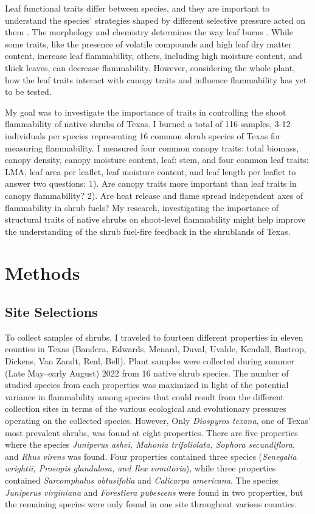 \documentclass[12pt]{report}
\begin{document}
Leaf functional traits differ between species, and they are important to understand the species' strategies shaped by different selective pressure acted on them \citep{wright2004worldwide}. The morphology and chemistry determines the way leaf burns \citep{anderson1970forest, owens1998seasonal, schwilk2011scaling, pausas2016secondary, guerrero2021leaf, ganteaume2021volatile,alam2020shoot}. While some traits, like the presence of volatile compounds and high leaf dry matter content, increase leaf flammability, others, including high moisture content, and thick leaves, can decrease flammability. However, considering the whole plant, how the leaf traits interact with canopy traits and influence flammability has yet to be tested.

My goal was to investigate the importance of traits in controlling the shoot flammability of native shrubs of Texas. I burned a total of 116 samples, 3-12 individuals per species representing 16 common shrub species of Texas for measuring flammability. I measured four common canopy traits: total biomass, canopy density, canopy moisture content, leaf: stem, and four common leaf traits: LMA, leaf area per leaflet, leaf moisture content, and leaf length per leaflet to answer two questions: 1). Are canopy traits more important than leaf traits in canopy flammability? 2). Are heat release and flame spread independent axes of flammability in shrub fuels? My research, investigating the importance of structural traits of native shrubs on shoot-level flammability might help improve the understanding of the shrub fuel-fire feedback in the shrublands of Texas.


\section{Methods}
\subsection{Site Selections}

To collect samples of shrubs, I traveled to fourteen different properties in eleven counties in Texas (Bandera, Edwards, Menard, Duval, Uvalde, Kendall, Bastrop, Dickens, Van Zandt, Real, Bell). Plant samples were collected during summer (Late May–early August) 2022 from 16 native shrub species. The number of studied species from each properties was maximized in light of the potential variance in flammability among species that could result from the different collection sites in terms of the various ecological and evolutionary pressures operating on the collected species. However, Only \emph{Diospyros texana}, one of Texas' most prevalent shrubs, was found at eight properties. There are five properties where the species \emph{Juniperus ashei, Mahonia trifoliolata, Sophora secundiflora}, and \emph{Rhus virens} was found. Four properties contained three species (\emph{Senegalia wrightii, Prosopis glandulosa, and Ilex vomitoria}), while three properties contained \emph{Sarcomphalus obtusifolia} \citep{hauenschild2016phylogenetic} and \emph{Calicarpa americana}. The species \emph{Juniperus virginiana} and \emph{Forestiera pubescens} were found in two properties, but the remaining species were only found in one site throughout various counties.
\end{document}

